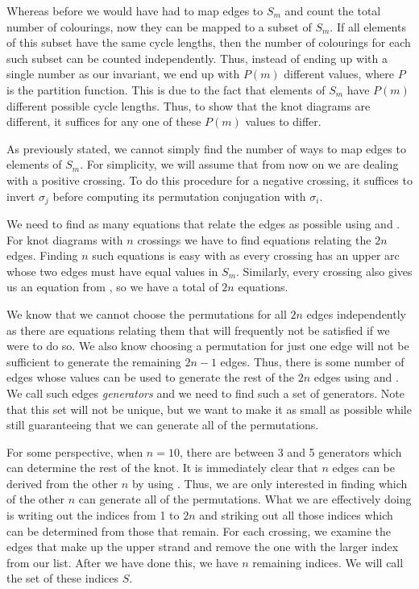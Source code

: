 \begin{paper}
Whereas before we would have had to map edges to $S_m$ and count the total
number of colourings, now they can be mapped to a subset of $S_m$.
If all elements of this subset have the same cycle lengths, then the number of
colourings for each such subset can be counted independently.
Thus, instead of ending up with a single number as our invariant, we end up with
$P(m)$ different values, where $P$ is the partition function.
This is due to the fact that elements of $S_m$ have $P(m)$ different possible
cycle lengths.
Thus, to show that the knot diagrams are different, it suffices for any one of
these $P(m)$ values to differ.

As previously stated, we cannot simply find the number of ways to map edges to
elements of $S_m$.
For simplicity, we will assume that from now on we are dealing with a positive
crossing.
To do this procedure for a negative crossing, it suffices to invert $\sigma_j$
before computing its permutation conjugation with $\sigma_i$.

We need to find as many equations that relate the edges as possible using
\eqUpper and \eqPositive.
For knot diagrams with $n$ crossings we have to find equations relating the $2n$
edges.
Finding $n$ such equations is easy with \eqUpper as every crossing has an upper
arc whose two edges must have equal values in $S_m$.
Similarly, every crossing also gives us an equation from \eqRight, so we have a
total of $2n$ equations.

We know that we cannot choose the permutations for all $2n$ edges independently
as there are equations relating them that will frequently not be satisfied if we
were to do so.
We also know choosing a permutation for just one edge will not be sufficient to
generate the remaining $2n-1$ edges.
Thus, there is some number of edges whose values can be used to generate the
rest of the $2n$ edges using \eqUpper and \eqRight.
We call such edges \textit{generators} and we need to find such a set of
generators.
Note that this set will not be unique, but we want to make it as small as
possible while still guaranteeing that we can generate all of the permutations.

For some perspective, when $n=10$, there are between 3 and 5 generators which
can determine the rest of the knot.
It is immediately clear that $n$ edges can be derived from the other $n$ by
using \eqUpper.
Thus, we are only interested in finding which of the other $n$ can generate all
of the permutations.
What we are effectively doing is writing out the indices from 1 to $2n$ and
striking out all those indices which can be determined from those that remain.
For each crossing, we examine the edges that make up the upper strand and remove
the one with the larger index from our list.
After we have done this, we have $n$ remaining indices.
We will call the set of these indices $S$.


\end{paper}
